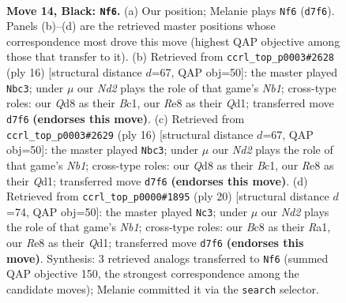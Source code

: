 \documentclass[11pt]{article}
\begin{document}
\clearpage

\begin{figure}[p]\centering
\begin{subfigure}{0.46\textwidth}\centering
\resizebox{\linewidth}{!}{%
\newchessgame
\chessboard[
  setfen={rnbqr1k1/pp1n1pb1/4p1pp/3p4/P2P4/1B3N1P/RPP1QPP1/1NB1R1K1 b - - 2 14},
  showmover=false,
  pgfstyle=straightmove, color=movearrow, markmove={d7-f6}
]}
\caption{}
\end{subfigure}\hfill
\begin{subfigure}{0.46\textwidth}\centering
\resizebox{\linewidth}{!}{%
\newchessgame
\chessboard[
  setfen={r1bqk2r/ppp1ppbp/1n4p1/n2P4/4P3/6P1/PP2NPBP/RNBQK2R w KQkq - 1 9},
  showmover=false,
  pgfstyle=straightmove, color=movearrow, markmove={b1-c3}
]}
\caption{}
\end{subfigure}
\\[4pt]
\begin{subfigure}{0.46\textwidth}\centering
\resizebox{\linewidth}{!}{%
\newchessgame
\chessboard[
  setfen={r1bqk2r/ppp1ppbp/1n4p1/n2P4/4P3/6P1/PP2NPBP/RNBQK2R w KQkq - 1 9},
  showmover=false,
  pgfstyle=straightmove, color=movearrow, markmove={b1-c3}
]}
\caption{}
\end{subfigure}\hfill
\begin{subfigure}{0.46\textwidth}\centering
\resizebox{\linewidth}{!}{%
\newchessgame
\chessboard[
  setfen={rn3rk1/pb2bppp/1q1ppn2/2p5/2P2B2/4P2P/PP1NBPP1/RN1Q1RK1 w - - 2 11},
  showmover=false,
  pgfstyle=straightmove, color=movearrow, markmove={b1-c3}
]}
\caption{}
\end{subfigure}
\caption{\textbf{Move 14, Black: \texttt{Nf6}.} (a) Our position; Melanie plays \texttt{Nf6} (\texttt{d7f6}). Panels (b)--(d) are the retrieved master positions whose correspondence most drove this move (highest QAP objective among those that transfer to it). (b) Retrieved from \texttt{ccrl\_top\_p0003\#2628} (ply 16) [structural distance $d$=67, QAP obj=50]: the master played \texttt{Nbc3}; under $\mu$ our \emph{Nd2} plays the role of that game's \emph{Nb1}; cross-type roles: our \emph{Q}d8 as their \emph{B}c1, our \emph{R}e8 as their \emph{Q}d1; transferred move \texttt{d7f6} \textbf{(endorses this move)}. (c) Retrieved from \texttt{ccrl\_top\_p0003\#2629} (ply 16) [structural distance $d$=67, QAP obj=50]: the master played \texttt{Nbc3}; under $\mu$ our \emph{Nd2} plays the role of that game's \emph{Nb1}; cross-type roles: our \emph{Q}d8 as their \emph{B}c1, our \emph{R}e8 as their \emph{Q}d1; transferred move \texttt{d7f6} \textbf{(endorses this move)}. (d) Retrieved from \texttt{ccrl\_top\_p0000\#1895} (ply 20) [structural distance $d$=74, QAP obj=50]: the master played \texttt{Nc3}; under $\mu$ our \emph{Nd2} plays the role of that game's \emph{Nb1}; cross-type roles: our \emph{B}c8 as their \emph{R}a1, our \emph{R}e8 as their \emph{Q}d1; transferred move \texttt{d7f6} \textbf{(endorses this move)}. Synthesis: 3 retrieved analogs transferred to \texttt{Nf6} (summed QAP objective 150, the strongest correspondence among the candidate moves); Melanie committed it via the \texttt{search} selector.}
\label{fig:thought-m27}
\end{figure}
\end{document}

